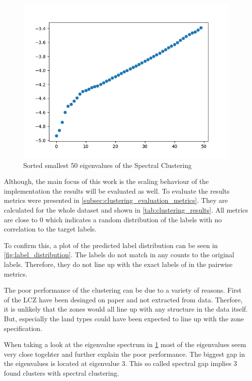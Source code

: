   \begin{figure}
    \centering
    \includegraphics[width=0.9\linewidth]{images/eigenvalues.png}
    \caption{Sorted smallest 50 eigenvalues of the Spectral Clustering}
    \label{fig:eigenvalues}
  \end{figure}



Although, the main focus of this work is the scaling behaviour of the implementation the results will be evaluated as
well. To evaluate the results metrics were presented in \cref{subsec:clustering_evaluation_metrics}.
They are calculated for the whole dataset and shown in \cref{tab:clustering_results}.
All metrics are close to 0 which indicates a random distribution of the labels with no correlation to the target
labels.

To confirm this, a plot of the predicted label distribution can be seen in \cref{fig:label_distribution}.
The labels do not match in any counts to the original labels. Therefore, they do not line up with the exact labels of
in the pairwise metrics.

The poor performance of the clustering can be due to a variety of reasons.
First of the \gls{LCZ} have been desinged on paper and not extracted from data. Therfore, it is unlikely that
the zones would all line up with any structure in the data itself.
But, especially the land types could have been expected to line up with the zone specification.

When taking a look at the eigenvalue spectrum in \cref{fig:eigenvalues} most of the eigenvalues seem very close togehter and
further explain the poor performance. The biggest gap in the eigenvalues is located at eigenvalue 3. This so called spectral gap
implies 3 found clusters with spectral clustering.

